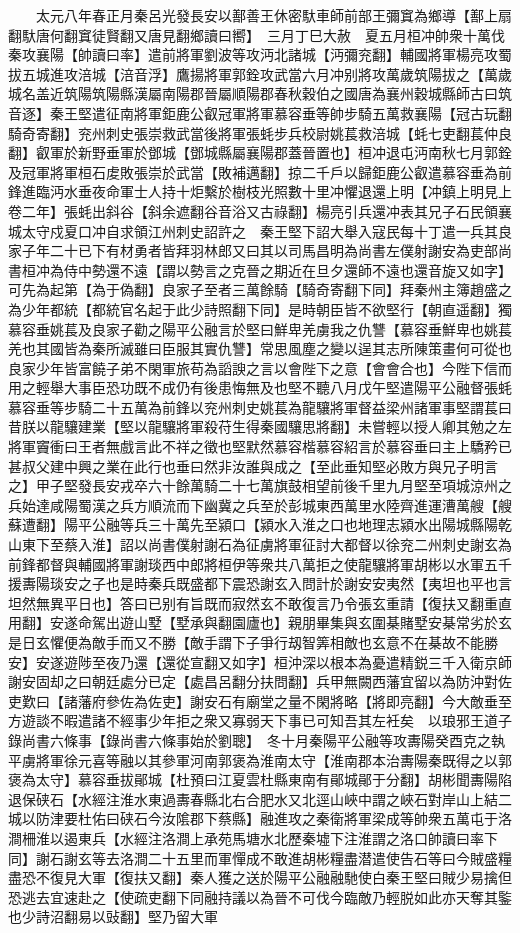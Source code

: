 　　太元八年春正月秦呂光發長安以鄯善王休密馱車師前部王彌窴為鄉導【鄯上扇翻馱唐何翻窴徒賢翻又唐見翻鄉讀曰嚮】　三月丁巳大赦　夏五月桓冲帥衆十萬伐秦攻襄陽【帥讀曰率】遣前將軍劉波等攻沔北諸城【沔彌兖翻】輔國將軍楊亮攻蜀拔五城進攻涪城【涪音浮】鷹揚將軍郭銓攻武當六月冲别將攻萬歲筑陽拔之【萬歲城名盖近筑陽筑陽縣漢屬南陽郡晉屬順陽郡春秋穀伯之國唐為襄州穀城縣師古曰筑音逐】秦王堅遣征南將軍鉅鹿公叡冠軍將軍慕容垂等帥步騎五萬救襄陽【冠古玩翻騎奇寄翻】兖州刺史張崇救武當後將軍張蚝步兵校尉姚萇救涪城【蚝七吏翻萇仲良翻】叡軍於新野垂軍於鄧城【鄧城縣屬襄陽郡蓋晉置也】桓冲退屯沔南秋七月郭銓及冠軍將軍桓石䖍敗張崇於武當【敗補邁翻】掠二千戶以歸鉅鹿公叡遣慕容垂為前鋒進臨沔水垂夜命軍士人持十炬繫於樹枝光照數十里冲懼退還上明【冲鎮上明見上卷二年】張蚝出斜谷【斜余遮翻谷音浴又古祿翻】楊亮引兵還冲表其兄子石民領襄城太守戍夏口冲自求領江州刺史詔許之　秦王堅下詔大舉入寇民每十丁遣一兵其良家子年二十已下有材勇者皆拜羽林郎又曰其以司馬昌明為尚書左僕射謝安為吏部尚書桓冲為侍中勢還不遠【謂以勢言之克晉之期近在旦夕還師不遠也還音旋又如字】可先為起第【為于偽翻】良家子至者三萬餘騎【騎奇寄翻下同】拜秦州主簿趙盛之為少年都統【都統官名起于此少詩照翻下同】是時朝臣皆不欲堅行【朝直遥翻】獨慕容垂姚萇及良家子勸之陽平公融言於堅曰鮮卑羌虜我之仇讐【慕容垂鮮卑也姚萇羌也其國皆為秦所滅雖曰臣服其實仇讐】常思風塵之變以逞其志所陳策畫何可從也良家少年皆富饒子弟不閑軍旅苟為謟諛之言以會陛下之意【會會合也】今陛下信而用之輕舉大事臣恐功既不成仍有後患悔無及也堅不聽八月戊午堅遣陽平公融督張蚝慕容垂等步騎二十五萬為前鋒以兖州刺史姚萇為龍驤將軍督益梁州諸軍事堅謂萇曰昔朕以龍驤建業【堅以龍驤將軍殺苻生得秦國驤思將翻】未嘗輕以授人卿其勉之左將軍竇衝曰王者無戲言此不祥之徵也堅默然慕容楷慕容紹言於慕容垂曰主上驕矜已甚叔父建中興之業在此行也垂曰然非汝誰與成之【至此垂知堅必敗方與兄子明言之】甲子堅發長安戎卒六十餘萬騎二十七萬旗鼓相望前後千里九月堅至項城涼州之兵始達咸陽蜀漢之兵方順流而下幽冀之兵至於彭城東西萬里水陸齊進運漕萬艘【艘蘇遭翻】陽平公融等兵三十萬先至潁口【潁水入淮之口也地理志潁水出陽城縣陽乾山東下至蔡入淮】詔以尚書僕射謝石為征虜將軍征討大都督以徐兖二州刺史謝玄為前鋒都督與輔國將軍謝琰西中郎將桓伊等衆共八萬拒之使龍驤將軍胡彬以水軍五千援夀陽琰安之子也是時秦兵既盛都下震恐謝玄入問計於謝安安夷然【夷坦也平也言坦然無異平日也】答曰已别有旨既而寂然玄不敢復言乃令張玄重請【復扶又翻重直用翻】安遂命駕出遊山墅【墅承與翻園廬也】親朋畢集與玄圍棊賭墅安棊常劣於玄是日玄懼便為敵手而又不勝【敵手謂下子爭行刼智筭相敵也玄意不在棊故不能勝安】安遂遊陟至夜乃還【還從宣翻又如字】桓沖深以根本為憂遣精鋭三千入衛京師謝安固却之曰朝廷處分已定【處昌呂翻分扶問翻】兵甲無闕西藩宜留以為防沖對佐吏歎曰【諸藩府參佐為佐吏】謝安石有廟堂之量不閑將略【將即亮翻】今大敵垂至方遊談不暇遣諸不經事少年拒之衆又寡弱天下事已可知吾其左衽矣　以琅邪王道子錄尚書六條事【錄尚書六條事始於劉聰】　冬十月秦陽平公融等攻夀陽癸酉克之執平虜將軍徐元喜等融以其參軍河南郭褒為淮南太守【淮南郡本治夀陽秦既得之以郭褒為太守】慕容垂拔鄖城【杜預曰江夏雲杜縣東南有鄖城鄖于分翻】胡彬聞夀陽陷退保硖石【水經注淮水東過夀春縣北右合肥水又北逕山峽中謂之峽石對岸山上結二城以防津要杜佑曰硖石今汝隂郡下蔡縣】融進攻之秦衛將軍梁成等帥衆五萬屯于洛澗柵淮以遏東兵【水經注洛澗上承苑馬塘水北歷秦墟下注淮謂之洛口帥讀曰率下同】謝石謝玄等去洛澗二十五里而軍憚成不敢進胡彬糧盡潜遣使告石等曰今賊盛糧盡恐不復見大軍【復扶又翻】秦人獲之送於陽平公融融馳使白秦王堅曰賊少易擒但恐逃去宜速赴之【使疏吏翻下同融持議以為晉不可伐今臨敵乃輕脱如此亦天奪其鍳也少詩沼翻易以䜴翻】堅乃留大軍